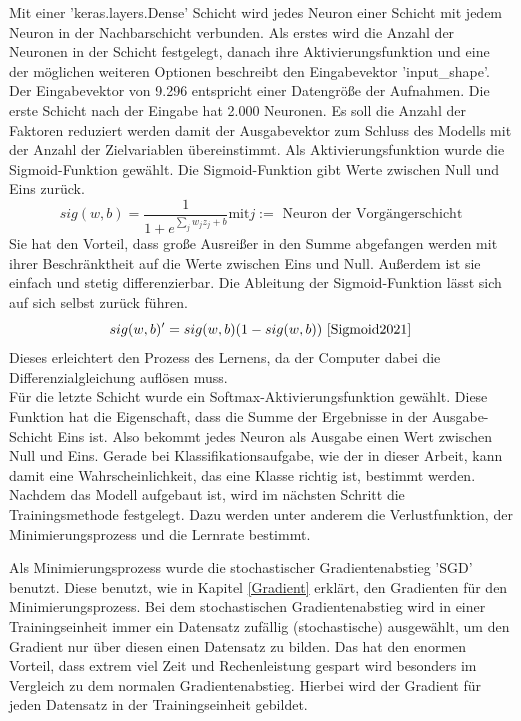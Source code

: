 Mit einer 'keras.layers.Dense' Schicht wird jedes Neuron einer Schicht mit jedem Neuron in der Nachbarschicht verbunden.  Als erstes wird die Anzahl der Neuronen in der Schicht festgelegt, danach ihre Aktivierungsfunktion und eine der möglichen weiteren Optionen beschreibt den Eingabevektor 'input\_shape'. \\
Der Eingabevektor von 9.296 entspricht einer Datengröße der Aufnahmen.  Die erste Schicht nach der Eingabe hat 2.000 Neuronen. Es soll die Anzahl der Faktoren reduziert werden damit der Ausgabevektor zum Schluss des Modells mit der Anzahl der Zielvariablen übereinstimmt. Als Aktivierungsfunktion wurde die Sigmoid-Funktion gewählt.  Die Sigmoid-Funktion gibt Werte zwischen Null und Eins zurück. 
\begin{equation}
sig(w,b) = \frac{1}{1+e^{\sum_{j} w_{j}z_{j} +b}}  \text{mit} j:= \text{ Neuron der Vorgängerschicht}
\end{equation}
Sie hat den Vorteil,  dass große Ausreißer in den Summe abgefangen werden mit ihrer Beschränktheit auf die Werte zwischen Eins und Null.  Außerdem ist sie einfach und stetig differenzierbar. Die Ableitung der Sigmoid-Funktion lässt sich auf sich selbst zurück führen.\\
\begin{equation}
sig(w,b)^{\prime} = sig(w,b)(1-sig(w,b)) \text{  \cite{Sigmoid2021}}
\end{equation}
Dieses erleichtert den Prozess des Lernens,  da der Computer dabei die Differenzialgleichung auflösen muss. \\
Für die letzte Schicht wurde ein Softmax-Aktivierungsfunktion gewählt. Diese Funktion hat die Eigenschaft, dass die Summe der Ergebnisse in der Ausgabe-Schicht Eins ist.  Also bekommt jedes Neuron als Ausgabe einen Wert zwischen Null und Eins. Gerade bei Klassifikationsaufgabe,  wie der in dieser Arbeit, kann damit eine Wahrscheinlichkeit, das eine Klasse richtig ist, bestimmt werden. \\
Nachdem das Modell aufgebaut ist, wird im nächsten Schritt die Trainingsmethode festgelegt.  Dazu werden unter anderem die Verlustfunktion,  der Minimierungsprozess und die Lernrate bestimmt.

Als Minimierungsprozess wurde die stochastischer Gradientenabstieg 'SGD' benutzt. Diese benutzt, wie in Kapitel \ref{Gradient} erklärt, den Gradienten für den Minimierungsprozess.  Bei dem stochastischen Gradientenabstieg wird in einer Trainingseinheit immer ein Datensatz zufällig (stochastische) ausgewählt, um den Gradient nur über diesen einen Datensatz zu bilden. Das hat den enormen Vorteil, dass extrem viel Zeit und Rechenleistung gespart wird besonders im Vergleich zu dem normalen Gradientenabstieg. Hierbei wird der Gradient für jeden Datensatz in der Trainingseinheit gebildet. \cite{Geron2019}\\
